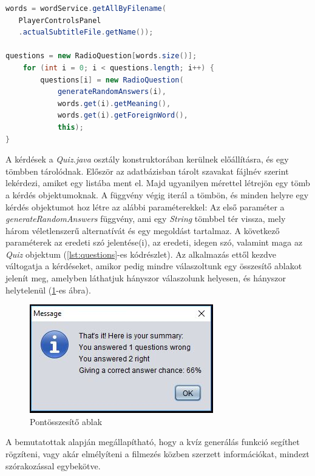 \begin{lstlisting}[caption=Kérdések előállítása, language=java, label={lst:questions}]
words = wordService.getAllByFilename(
   PlayerControlsPanel
   .actualSubtitleFile.getName());

questions = new RadioQuestion[words.size()];
    for (int i = 0; i < questions.length; i++) {
        questions[i] = new RadioQuestion(
            generateRandomAnswers(i),
            words.get(i).getMeaning(),
            words.get(i).getForeignWord(),
            this);
}
\end{lstlisting}

 A kérdések a \textit{Quiz.java} osztály konstruktorában kerülnek előállításra, és egy tömbben tárolódnak. Először az adatbázisban tárolt szavakat fájlnév szerint lekérdezi, amiket egy listába ment el. Majd ugyanilyen mérettel létrejön egy tömb a kérdés objektumoknak. A függvény végig iterál a tömbön, és minden helyre egy kérdés objektumot hoz létre az alábbi paraméterekkel: Az első paraméter a \textit{generateRandomAnswers} függvény, ami egy \textit{String} tömbbel tér vissza, mely három véletlenszerű alternatívát és egy megoldást tartalmaz. A következő paraméterek az eredeti szó jelentése(i), az eredeti, idegen szó, valamint maga az \textit{Quiz} objektum (\ref{lst:questions}-es kódrészlet). Az alkalmazás ettől kezdve váltogatja a kérdéseket, amikor pedig mindre válaszoltunk egy összesítő ablakot jelenít meg, amelyben láthatjuk hányszor válaszolunk helyesen, és hányszor helytelenül (\ref{fig:summary}-es ábra).
 
\begin{figure}[!h]
\centering
  \includegraphics[width=.5\linewidth]{images/summary.jpg}
  \caption{Pontösszesítő ablak}
  \label{fig:summary}
\end{figure}

A bemutatottak alapján megállapítható, hogy a kvíz generálás funkció segíthet rögzíteni, vagy akár elmélyíteni a filmezés közben szerzett információkat, mindezt szórakozással egybekötve.
